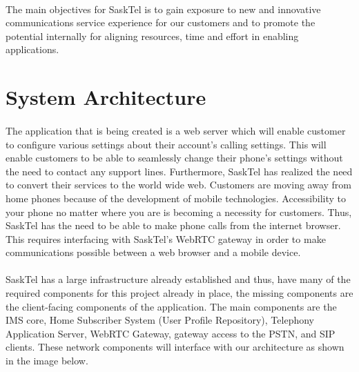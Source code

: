 \documentclass[12pt]{article}
\begin{document}
\paragraph{} 
	The main objectives for SaskTel is to gain exposure to new and innovative communications service experience for our customers and to promote the potential internally for aligning resources, time and effort in enabling applications.
\pagebreak

\section{System Architecture}
\paragraph{}
	The application that is being created is a web server which will enable customer to configure various settings about their account's calling settings. This will enable customers to be able to seamlessly change their phone's settings without the need to contact any support lines. Furthermore, SaskTel has realized the need to convert their services to the world wide web. Customers are moving away from home phones because of the development of mobile technologies. Accessibility to your phone no matter where you are is becoming a necessity for customers. Thus, SaskTel has the need to be able to make phone calls from the internet browser. This requires interfacing with SaskTel's WebRTC gateway in order to make communications possible between a web browser and a mobile device.
	
	
\paragraph{}
	SaskTel has a large infrastructure already established and thus, have many of the required components for this project already in place, the missing components are the client-facing components of the application. The main components are the IMS core, Home Subscriber System (User Profile Repository), Telephony Application Server, WebRTC Gateway, gateway access to the PSTN, and SIP clients. These network components will interface with our architecture as shown in the image below.
\end{document}
